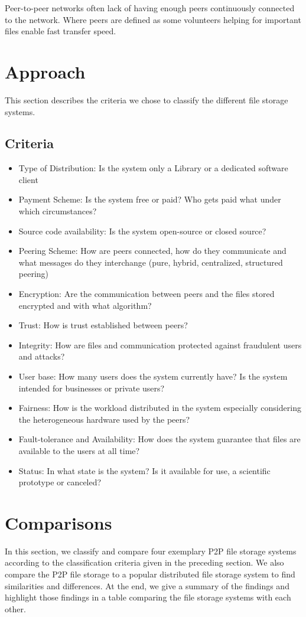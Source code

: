 Peer-to-peer networks often lack of having enough peers continuously connected
to the network. Where peers are defined as some volunteers helping for important
files enable fast transfer speed.


\section{Approach} %
This section describes the criteria we chose to classify the
different file storage systems.


\subsection{Criteria}
\begin{itemize}
\item Type of Distribution: Is the system only a Library or a dedicated software client
\item Payment Scheme: Is the system free or paid? Who gets paid what under which circumstances?
\item Source code availability: Is the system open-source or closed source?
\item Peering Scheme: How are peers connected, how do they communicate and what messages do they interchange (pure, hybrid, centralized, structured peering)
\item Encryption: Are the communication between peers and the files stored encrypted and with what algorithm?
\item Trust: How is trust established between peers?
\item Integrity: How are files and communication protected against fraudulent users and attacks?
\item User base: How many users does the system currently have? Is the system intended for businesses or private users?
\item Fairness: How is the workload distributed in the system especially considering the heterogeneous hardware used by the peers? 
\item Fault-tolerance and Availability: How does the system guarantee that files are available to the users at all time? 
\item Status: In what state is the system? Is it available for use, a scientific prototype or canceled?
\end{itemize}

\section{Comparisons} In this section, we classify and compare four exemplary
P2P file storage systems according to the classification criteria given in the
preceding section. We also compare the P2P file storage to a popular distributed
file storage system to find similarities and differences. At the end, we give a
summary of the findings and highlight those findings in a table comparing the
file storage systems with each other.

